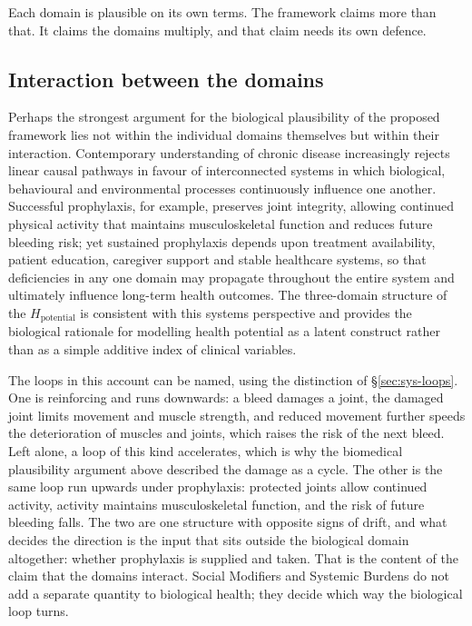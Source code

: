 Each domain is plausible on its own terms. The framework claims more than
that. It claims the domains multiply, and that claim needs its own defence.

\subsection{Interaction between the domains}

Perhaps the strongest argument for the biological plausibility of the proposed framework lies not within the individual domains themselves but within their interaction. Contemporary understanding of chronic disease increasingly rejects linear causal pathways in favour of interconnected systems in which biological, behavioural and environmental processes continuously influence one another. Successful prophylaxis, for example, preserves joint integrity, allowing continued physical activity that maintains musculoskeletal function and reduces future bleeding risk; yet sustained prophylaxis depends upon treatment availability, patient education, caregiver support and stable healthcare systems, so that deficiencies in any one domain may propagate throughout the entire system and ultimately influence long-term health outcomes. The three-domain structure of the $H_{\text{potential}}$ is consistent with this systems perspective and provides the biological rationale for modelling health potential as a latent construct rather than as a simple additive index of clinical variables.

The loops in this account can be named, using the distinction of \S\ref{sec:sys-loops}. One is reinforcing and runs downwards: a bleed damages a joint, the damaged joint limits movement and muscle strength, and reduced movement further speeds the deterioration of muscles and joints, which raises the risk of the next bleed. Left alone, a loop of this kind accelerates, which is why the biomedical plausibility argument above described the damage as a cycle. The other is the same loop run upwards under prophylaxis: protected joints allow continued activity, activity maintains musculoskeletal function, and the risk of future bleeding falls. The two are one structure with opposite signs of drift, and what decides the direction is the input that sits outside the biological domain altogether: whether prophylaxis is supplied and taken. That is the content of the claim that the domains interact. Social Modifiers and Systemic Burdens do not add a separate quantity to biological health; they decide which way the biological loop turns.

